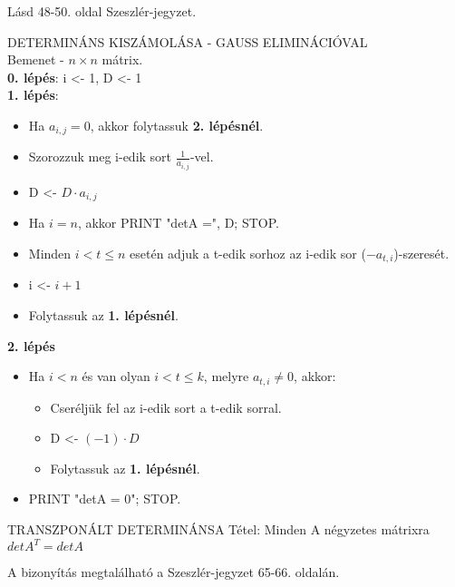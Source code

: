 \begin{leftbar}
Lásd 48-50. oldal Szeszlér-jegyzet.
\end{leftbar}
\begin{framed}
DETERMINÁNS KISZÁMOLÁSA -  GAUSS ELIMINÁCIÓVAL\\
Bemenet - $n\times n$ mátrix.\\
\textbf{0. lépés}: i <- 1, D <- 1\\
\textbf{1. lépés}:
\begin{itemize}
\item Ha $a_{i,j} = 0$, akkor folytassuk \textbf{2. lépésnél}.
\item Szorozzuk meg i-edik sort $\frac{1}{a_{i,j}}$-vel.
\item D <- $D \cdot a_{i,j}$
\item Ha $i = n$, akkor PRINT "detA =", D; STOP.
\item Minden $i < t \leq n$ esetén adjuk a t-edik sorhoz az i-edik sor ($-a_{t,i}$)-szeresét.
\item i <- $i+1$
\item Folytassuk az \textbf{1. lépésnél}.
\end{itemize}
\textbf{2. lépés}
\begin{itemize}
\item Ha $i < n$ és van olyan $i < t \leq k$, melyre $a_{t,i} \neq 0$, akkor:
\begin{itemize}
\item Cseréljük fel az i-edik sort a t-edik sorral.
\item D <- $(-1)\cdot D$
\item Folytassuk az \textbf{1. lépésnél}.
\end{itemize}
\item PRINT "detA = 0"; STOP.
\end{itemize}
\end{framed}
\begin{framed}
TRANSZPONÁLT DETERMINÁNSA Tétel: Minden A négyzetes mátrixra $detA^T = detA$
\end{framed}
\begin{leftbar}
A bizonyítás megtalálható a Szeszlér-jegyzet 65-66. oldalán.
\end{leftbar}
